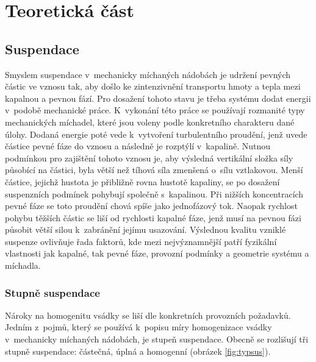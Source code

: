 \chapter{Teoretická část}
\section{Suspendace}
Smyslem suspendace v~mechanicky míchaných nádobách je udržení pevných částic ve vznosu tak, aby došlo ke zintenzivnění transportu hmoty a tepla mezi kapalnou a pevnou fází. Pro dosažení tohoto stavu je třeba systému dodat energii v~podobě mechanické práce. K~vykonání této práce se používají rozmanité typy mechanických míchadel, které jsou voleny podle konkretního charakteru dané úlohy. Dodaná energie poté vede k~vytvoření turbulentního proudění, jenž uvede částice pevné fáze do vznosu a následně je rozptýlí v~kapalině. Nutnou podmínkou pro zajištění tohoto vznosu je, aby výsledná vertikální složka síly působící na částici, byla větší než tíhová síla zmenšená o~sílu vztlakovou. Menší částice, jejichž hustota je přibližně rovna hustotě kapaliny, se po dosažení suspenzních podmínek pohybují společně s~kapalinou. Při nižších koncentracích pevné fáze se toto proudění chová spíše jako jednofázový tok. Naopak rychlost pohybu těžších částic se liší od rychlosti kapalné fáze, jenž musí na pevnou fázi působit větší silou k~zabránění jejímu usazování. Výslednou kvalitu vzniklé suspenze ovlivňuje řada faktorů, kde mezi nejvýznamnější patří fyzikální vlastnosti jak kapalné, tak pevné fáze, provozní podmínky a geometrie systému a míchadla.

\subsection{Stupně suspendace}
Nároky na homogenitu vsádky se liší dle konkretních provozních požadavků. Jedním z~pojmů, který se používá k~popisu míry homogenizace vsádky v~mechanicky míchaných nádobách, je stupeň suspendace. Obecně se rozlišují tři stupně suspendace: částečná, úplná a homogenní (obrázek \ref{fig:typsus}). 
  

